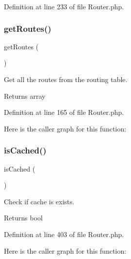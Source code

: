 Definition at line 233 of file Router.\+php.

\mbox{\label{class_zest_1_1_router_1_1_router_a18da86bf318ebe47e501aaad267d59ed}} 
\subsubsection{\texorpdfstring{get\+Routes()}{getRoutes()}}
{\footnotesize\ttfamily get\+Routes (\begin{DoxyParamCaption}{ }\end{DoxyParamCaption})}

Get all the routes from the routing table.

\begin{DoxyReturn}{Returns}
array 
\end{DoxyReturn}


Definition at line 165 of file Router.\+php.

Here is the caller graph for this function\+:
\mbox{\label{class_zest_1_1_router_1_1_router_afac82e816d0fc5049c3295f0d356acdb}} 
\subsubsection{\texorpdfstring{is\+Cached()}{isCached()}}
{\footnotesize\ttfamily is\+Cached (\begin{DoxyParamCaption}{ }\end{DoxyParamCaption})}

Check if cache is exists.

\begin{DoxyReturn}{Returns}
bool 
\end{DoxyReturn}


Definition at line 403 of file Router.\+php.

Here is the caller graph for this function\+:
\mbox{\label{class_zest_1_1_router_1_1_router_ab8c3ec4d9f977b32b63e6fc3393c2a83}} 
